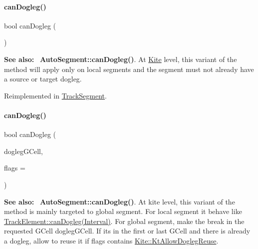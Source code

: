 \mbox{\label{classKite_1_1TrackElement_accb4c6a7ee2678a0cff4dbc4a7860fe1}} 
\paragraph{\texorpdfstring{can\+Dogleg()}{canDogleg()}\hspace{0.1cm}{\footnotesize\ttfamily [2/3]}}
{\footnotesize\ttfamily bool can\+Dogleg (\begin{DoxyParamCaption}\item[{\textbf{ Interval}}]{ }\end{DoxyParamCaption})\hspace{0.3cm}{\ttfamily [virtual]}}

{\bfseries See also\+:}~ \textbf{ Auto\+Segment\+::can\+Dogleg()}. At \mbox{\hyperlink{namespaceKite}{Kite}} level, this variant of the method will apply only on local segments and the segment must not already have a source or target dogleg. 

Reimplemented in \mbox{\hyperlink{classKite_1_1TrackSegment_accb4c6a7ee2678a0cff4dbc4a7860fe1}{Track\+Segment}}.

\mbox{\label{classKite_1_1TrackElement_a4f040cf33009e4886d401115c3bea838}} 
\paragraph{\texorpdfstring{can\+Dogleg()}{canDogleg()}\hspace{0.1cm}{\footnotesize\ttfamily [3/3]}}
{\footnotesize\ttfamily bool can\+Dogleg (\begin{DoxyParamCaption}\item[{\textbf{ Katabatic\+::\+G\+Cell} $\ast$}]{dogleg\+G\+Cell,  }\item[{unsigned int}]{flags = {} }\end{DoxyParamCaption})\hspace{0.3cm}{\ttfamily [virtual]}}

{\bfseries See also\+:}~ \textbf{ Auto\+Segment\+::can\+Dogleg()}. At kite level, this variant of the method is mainly targeted to global segment. For local segment it behave like \mbox{\hyperlink{classKite_1_1TrackElement_accb4c6a7ee2678a0cff4dbc4a7860fe1}{Track\+Element\+::can\+Dogleg(\+Interval)}}. For global segment, make the break in the requested G\+Cell {\ttfamily dogleg\+G\+Cell}. If it\textquotesingle{}s in the first or last G\+Cell and there is already a dogleg, allow to reuse it if {\ttfamily flags} contains \mbox{\hyperlink{namespaceKite_acca8fffa3182dea5f94208f454f14b47a766f453d6caa06490196a952762f0bb8}{Kite\+::\+Kt\+Allow\+Dogleg\+Reuse}}. 

